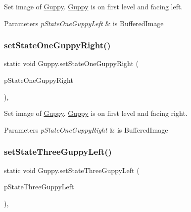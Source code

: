 Set image of \mbox{\hyperlink{class_guppy}{Guppy}}. \mbox{\hyperlink{class_guppy}{Guppy}} is on first level and facing left.


\begin{DoxyParams}{Parameters}
{\em p\+State\+One\+Guppy\+Left} & is Buffered\+Image \\
\hline
\end{DoxyParams}
\mbox{\label{class_guppy_a49fdfd0f9d8e9eacbb032a0e16b67db0}} 
\subsubsection{\texorpdfstring{set\+State\+One\+Guppy\+Right()}{setStateOneGuppyRight()}}
{\footnotesize\ttfamily static void Guppy.\+set\+State\+One\+Guppy\+Right (\begin{DoxyParamCaption}\item[{final Buffered\+Image}]{p\+State\+One\+Guppy\+Right }\end{DoxyParamCaption})\hspace{0.3cm}{\ttfamily [inline]}, {\ttfamily [static]}}

Set image of \mbox{\hyperlink{class_guppy}{Guppy}}. \mbox{\hyperlink{class_guppy}{Guppy}} is on first level and facing right.


\begin{DoxyParams}{Parameters}
{\em p\+State\+One\+Guppy\+Right} & is Buffered\+Image \\
\hline
\end{DoxyParams}
\mbox{\label{class_guppy_ad66c660e52a40d1f10398c04b3a72d2c}} 
\subsubsection{\texorpdfstring{set\+State\+Three\+Guppy\+Left()}{setStateThreeGuppyLeft()}}
{\footnotesize\ttfamily static void Guppy.\+set\+State\+Three\+Guppy\+Left (\begin{DoxyParamCaption}\item[{final Buffered\+Image}]{p\+State\+Three\+Guppy\+Left }\end{DoxyParamCaption})\hspace{0.3cm}{\ttfamily [inline]}, {\ttfamily [static]}}

